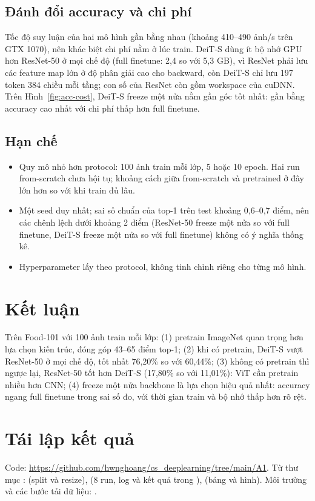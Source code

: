 \documentclass[11pt, a4paper]{article}
\begin{document}
\subsection{Đánh đổi accuracy và chi phí}
Tốc độ suy luận của hai mô hình gần bằng nhau (khoảng 410--490 ảnh/s trên GTX 1070), nên khác biệt chi phí nằm ở lúc train. DeiT-S dùng ít bộ nhớ GPU hơn ResNet-50 ở mọi chế độ (full finetune: 2,4 so với 5,3 GB), vì ResNet phải lưu các feature map lớn ở độ phân giải cao cho backward, còn DeiT-S chỉ lưu 197 token 384 chiều mỗi tầng; con số của ResNet còn gồm workspace của cuDNN. Trên Hình~\ref{fig:acc-cost}, DeiT-S freeze một nửa nằm gần góc tốt nhất: gần bằng accuracy cao nhất với chi phí thấp hơn full finetune.

\subsection{Hạn chế}
\begin{itemize}
  \item Quy mô nhỏ hơn protocol: 100 ảnh train mỗi lớp, 5 hoặc 10 epoch. Hai run from-scratch chưa hội tụ; khoảng cách giữa from-scratch và pretrained ở đây lớn hơn so với khi train đủ lâu.
  \item Một seed duy nhất; sai số chuẩn của top-1 trên test khoảng 0,6--0,7 điểm, nên các chênh lệch dưới khoảng 2 điểm (ResNet-50 freeze một nửa so với full finetune, DeiT-S freeze một nửa so với full finetune) không có ý nghĩa thống kê.
  \item Hyperparameter lấy theo protocol, không tinh chỉnh riêng cho từng mô hình.
\end{itemize}

\section{Kết luận}

Trên Food-101 với 100 ảnh train mỗi lớp: (1) pretrain ImageNet quan trọng hơn lựa chọn kiến trúc, đóng góp 43--65 điểm top-1; (2) khi có pretrain, DeiT-S vượt ResNet-50 ở mọi chế độ, tốt nhất 76,20\% so với 60,44\%; (3) không có pretrain thì ngược lại, ResNet-50 tốt hơn DeiT-S (17,80\% so với 11,01\%): ViT cần pretrain nhiều hơn CNN; (4) freeze một nửa backbone là lựa chọn hiệu quả nhất: accuracy ngang full finetune trong sai số đo, với thời gian train và bộ nhớ thấp hơn rõ rệt.

\section*{Tái lập kết quả}
Code: \url{https://github.com/hwnghoang/cs_deeplearning/tree/main/A1}. Từ thư mục :  (split và resize),  (8 run, log và kết quả trong ),  (bảng và hình). Môi trường và các bước tải dữ liệu: .



\end{document}
